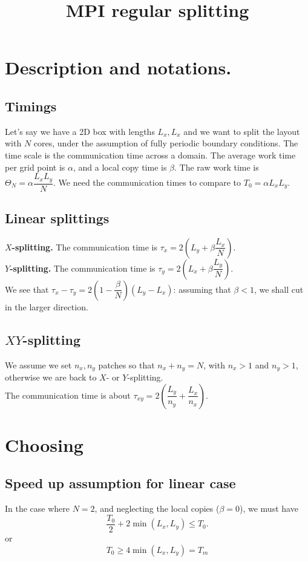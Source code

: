 \documentclass[aps]{revtex4}
\begin{document}
\title{MPI regular splitting}
\maketitle
	
\section{Description and notations.}
\subsection{Timings}
Let's say we have a 2D box with lengths $L_x,L_x$ and
we want to split the layout with $N$ cores, under the assumption
of fully periodic boundary conditions.
The time scale is the communication time across a domain.
The average work time per grid point is $\alpha$, and
a local copy time is $\beta$. The raw
work time is $\Theta_N=\alpha\dfrac{L_xL_y}{N}$. We need
the communication times to compare to $T_0=\alpha L_xL_y$.\\

\subsection{Linear splittings}

\textbf{$X$-splitting.}
The communication time is $\tau_x=2\left(L_y + \beta \dfrac{L_x}{N}\right)$.\\
\textbf{$Y$-splitting.}
The communication time is $\tau_y=2\left(L_x + \beta \dfrac{L_y}{N}\right)$.\\

We see that $\tau_x-\tau_y=2\left(1-\dfrac{\beta}{N}\right)\left(L_y-L_x\right)$: assuming that $\beta<1$, we
shall cut in the larger direction.\\

\subsection{$XY$-splitting} 
We assume we set $n_x,n_y$ patches so that $n_x+n_y=N$,
with $n_x>1$ and $n_y>1$, otherwise we are back to $X$- or $Y$-splitting.\\
The communication time is about $\tau_{xy}=2\left(\dfrac{L_y}{n_y}+\dfrac{L_x}{n_x}\right)$.

\section{Choosing}
\subsection{Speed up assumption for linear case}
In the case where $N=2$, and neglecting the local copies ($\beta=0$), we must have
$$
	\dfrac{T_0}{2} + 2 \min\left(L_x,L_y\right) \leq T_0.
$$
or
$$
	T_0 \geq 4 \min\left(L_x,L_y\right) = T_m
$$
\end{document}
